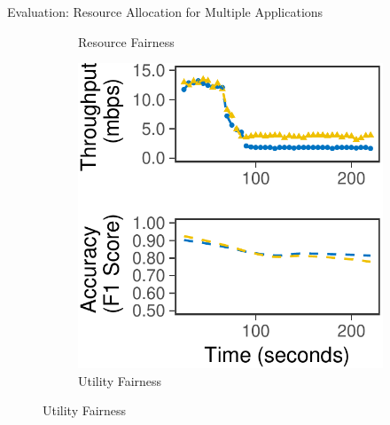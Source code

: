\begin{frame}{Evaluation: Resource Allocation for Multiple Applications}
\begin{figure}
\begin{subfigure}[t]{0.45\columnwidth}
      \caption{Resource Fairness}
      \label{fig:eq-bw}
    \end{subfigure}
    \hfill
    \begin{subfigure}[t]{0.45\columnwidth}
      \centering
      \includegraphics[width=\textwidth]{figures/multitask-right.pdf}
      \caption{Utility Fairness}
      \label{fig:eq-acc}
    \end{subfigure}
  \end{figure}
\end{frame}

